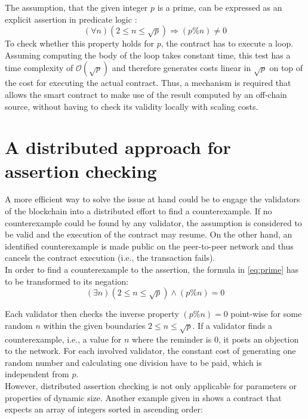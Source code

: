 The assumption, that the given integer $p$ is a prime, can be expressed as an explicit assertion in predicate logic \cite{thiemann_2020}: 
\begin{equation}\label{eq:prime}
    (\forall n) (2 \le n \le \sqrt{p}) \Rightarrow (p \% n) \neq 0
\end{equation}
To check whether this property holds for $p$, the contract has to execute a loop. Assuming computing the body of the loop takes constant time, this test has a time complexity of $\mathcal{O}(\sqrt{p})$ and therefore generates costs linear in $\sqrt{p}$ on top of the cost for executing the actual contract. Thus, a mechanism is required that allows the smart contract to make use of the result computed by an off-chain source, without having to check its validity locally with scaling costs.

\section{A distributed approach for assertion checking}
A more efficient way to solve the issue at hand could be to engage the validators of the blockchain into a distributed effort to find a counterexample. If no counterexample could be found by any validator, the assumption is considered to be valid and the execution of the contract may resume. On the other hand, an identified counterexample is made public on the peer-to-peer network and thus cancels the contract execution (i.e., the transaction fails). \\
In order to find a counterexample to the assertion, the formula in \eqref{eq:prime} has to be transformed to its negation:
\begin{equation}\label{eq:prime_neg}
	(\exists n) (2 \le n \le \sqrt{p}) \wedge (p \% n) = 0
\end{equation}

Each validator then checks the inverse property $(p \% n) = 0$ point-wise for some random $n$ within the given boundaries $2 \le n \le \sqrt{p}$. If a validator finds a counterexample, i.e., a value for $n$ where the reminder is $0$, it posts an objection to the network. For each involved validator, the constant cost of generating one random number and calculating one division have to be paid, which is independent from $p$.  \\
However, distributed assertion checking is not only applicable for parameters or properties of dynamic size. Another example given in \cite{thiemann_2020} shows a contract that expects an array of integers sorted in ascending order: 

